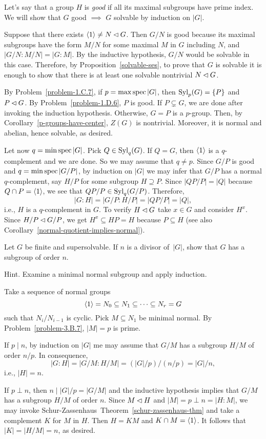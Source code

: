 \begin{solution} Let's say that a group $H$ is \textsl{good\/} if all its maximal subgroups have prime index. We will show that $G$ good $\implies$ $G$ solvable by induction on $|G|$. 

Suppose that there exists $\langle1\rangle\ne N\lhd G$. Then $G/N$ is good because its maximal subgroups have the form $M/N$ for some maximal $M$ in $G$ including $N$, and $|G/N:M/N|=|G:M|$. By the inductive hypothesis, $G/N$ would be solvable in this case. Therefore, by Proposition~\ref{solvable-ses}, to prove that $G$ is solvable it is enough to show that there is at least one solvable nontrivial $N\lhd G$.

By Problem~\ref{problem-1.C.7}, if $p=\max\operatorname{spec}|G|$, then ${\rm Syl}_p(G)=\{P\}$ and $P\lhd G$. By Problem~\ref{problem-1.D.6}, $P$ is good. If $P\varsubsetneq G$, we are done after invoking the induction hypothesis. Otherwise, $G=P$ is a $p$-group. Then, by Corollary~\ref{p-groups-have-center}, $Z(G)$ is nontrivial. Moreover, it is normal and abelian, hence solvable, as desired.

Let now $q=\min\operatorname{spec}|G|$. Pick $Q\in{\rm Syl}_q(G)$. If $Q=G$, then $\langle1\rangle$ is a $q$-complement and we are done. So we may assume that $q\ne p$. Since $G/P$ is good and $q=\min\operatorname{spec}|G/P|$, by induction on $|G|$ we may infer that $G/P$ has a normal $q$-complement, say $H/P$ for some subgroup $H\supseteq P$. Since $|QP/P|=|Q|$ because $Q\cap P=\langle1\rangle$, we see that $QP/P\in{\rm Syl}_q(G/P)$. Therefore,
$$
    |G:H|=|G/P:H/P|=|QP/P|=|Q|,
$$
i.e., $H$ is a $q$-complement in $G$. To verify $H\lhd G$ take $x\in G$ and consider $H^x$. Since $H/P\lhd G/P$, we get $H^x\subseteq HP=H$ because $P\subseteq H$ (see also Corollary~\ref{normal-quotient-implies-normal}).  \end{solution}

\begin{probl}
    Let\/ $G$ be finite and supersolvable. If\/ $n$ is a divisor of\/~$|G|$, show that\/ $G$ has a subgroup of order\/ $n$.
    
    \textrm{\rm Hint. Examine a minimal normal subgroup and apply induction.}
\end{probl}

\begin{solution} Take a sequence of normal groups
$$
    \langle1\rangle=N_0\subseteq N_1\subseteq\cdots\subseteq N_r=G
$$
such that $N_i/N_{i-1}$ is cyclic. Pick $M\subseteq N_1$ be minimal normal. By Problem~\ref{problem-3.B.7}, $|M|=p$ is prime.

If $p\mid n$, by induction on $|G|$ me may assume that $G/M$ has a subgroup $H/M$ of order $n/p$. In consequence,
$$
    |G:H|=|G/M:H/M|=(|G|/p)/(n/p)=|G|/n,
$$
i.e., $|H|=n$.

If $p\perp n$, then $n\mid |G|/p=|G/M|$ and the inductive hypothesis implies that $G/M$ has a subgroup $H/M$ of order $n$. Since $M\lhd H$ and $|M|=p\perp n=|H:M|$, we may invoke Schur-Zassenhaus~Theorem~\ref{schur-zassenhaus-thm} and take a complement $K$ for $M$ in $H$. Then $H=KM$ and $K\cap M=\langle1\rangle$. It follows that $|K|=|H/M|=n$, as desired.  \end{solution}


